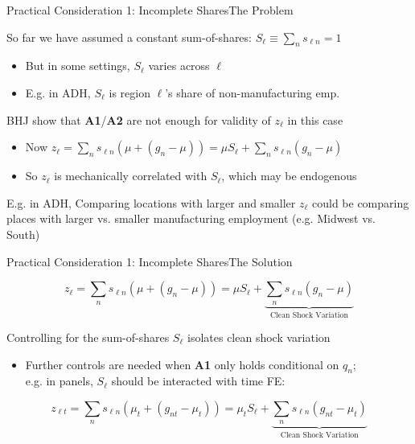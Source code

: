 \documentclass[t]{beamer}
\begin{document}
\begin{frame}{Practical Consideration 1: Incomplete Shares}{The Problem}

\vspace{-5mm}
So far we have assumed a constant sum-of-shares: $S_\ell\equiv\sum_n s_{\ell n}=1$\smallskip
\begin{itemize}
\item But in some settings, $S_\ell$ varies across $\ell$\smallskip
\item E.g. in ADH, $S_\ell$ is region $\ell$'s share of non-manufacturing emp.
\end{itemize}\bigskip\pause
 BHJ show that \textbf{A1}/\textbf{A2} are not enough for validity of $z_\ell$ in this case\smallskip
\begin{itemize}
\item Now $z_\ell=\sum_n s_{\ell n}\left(\mu+(g_n-\mu)\right)=\mu S_\ell+\sum_n s_{\ell n}(g_n-\mu)$\smallskip
\item So $z_\ell$ is mechanically correlated with $S_\ell$, which may be endogenous 
\end{itemize}


E.g. in ADH, Comparing locations with larger and smaller $z_\ell$ could be comparing places with larger vs. smaller manufacturing employment (e.g. Midwest vs. South)

\end{frame}

\begin{frame}{Practical Consideration 1: Incomplete Shares}{The Solution}

$$
z_\ell = \sum_n s_{\ell n}\left(\mu+(g_n-\mu)\right) = \mu S_\ell + \underbrace{\sum_n s_{\ell n}(g_n-\mu)}_{\text{Clean Shock Variation}}
$$

Controlling for the sum-of-shares $S_\ell$ isolates clean shock variation\smallskip\pause{}

\begin{itemize}
\item Further controls are needed when \textbf{A1} only holds conditional on $q_n$; \\ e.g. in panels, $S_\ell$ should be interacted with time FE:
\end{itemize}
$$
z_{\ell t} = \sum_n s_{\ell n}\left(\mu_t+(g_{nt}-\mu_t)\right) = \mu_t S_\ell + \underbrace{\sum_n s_{\ell n}(g_{nt}-\mu_t)}_{\text{Clean Shock Variation}}
$$
\end{frame}
\end{document}
